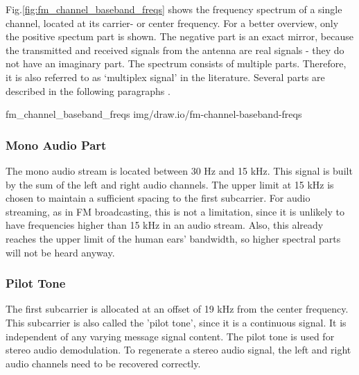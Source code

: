 Fig.\ref{fig:fm_channel_baseband_freqs} shows the frequency spectrum of a single channel, located at its carrier- or center frequency.
For a better overview, only the positive spectum part is shown.
The negative part is an exact mirror, because the transmitted and received signals from the antenna are real signals - they do not have an imaginary part.
The spectrum consists of multiple parts. Therefore, it is also referred to as `multiplex signal' in the literature. Several parts are described in the following paragraphs \cite{EbuFmRegulators}\cite{EtsiFmSoundBroadcastingServiceHarmonizedStandard}\cite{ElectronicsNotesFmTutorial}.

 {fm_channel_baseband_freqs} {img/draw.io/fm-channel-baseband-freqs}

\subsubsection{Mono Audio Part}

The mono audio stream is located between 30 Hz and 15 kHz.
This signal is built by the sum of the left and right audio channels.
The upper limit at 15 kHz is chosen to maintain a sufficient spacing to the first subcarrier.
For audio streaming, as in FM broadcasting, this is not a limitation, since it is unlikely to have frequencies higher than 15 kHz in an audio stream.
Also, this already reaches the upper limit of the human ears' bandwidth, so higher spectral parts will not be heard anyway.

\subsubsection{Pilot Tone}

The first subcarrier is allocated at an offset of 19 kHz from the center frequency.
This subcarrier is also called the 'pilot tone', since it is a continuous signal.
It is independent of any varying message signal content.
The pilot tone is used for stereo audio demodulation.
To regenerate a stereo audio signal, the left and right audio channels need to be recovered correctly.

